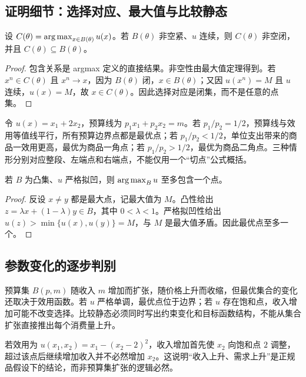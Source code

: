 \subsection{证明细节：选择对应、最大值与比较静态}

\begin{proposition}[选择对应的集合值性质]
设 $C(\theta)=\operatorname*{arg\,max}_{x\in B(\theta)}u(x)$。若 $B(\theta)$ 非空紧、$u$ 连续，则 $C(\theta)$ 非空闭，并且 $C(\theta)\subseteq B(\theta)$。
\end{proposition}
\begin{proof}
包含关系是 argmax 定义的直接结果。非空性由最大值定理得到。若 $x^n\in C(\theta)$ 且 $x^n\to x$，因为 $B(\theta)$ 闭，$x\in B(\theta)$；又因 $u(x^n)=M$ 且 $u$ 连续，$u(x)=M$，故 $x\in C(\theta)$。因此选择对应是闭集，而不是任意的点集。
\end{proof}

\begin{example}[线性效用的整段最优]
令 $u(x)=x_1+2x_2$，预算线为 $p_1x_1+p_2x_2=m$。若 $p_1/p_2=1/2$，预算线与效用等值线平行，所有预算边界点都是最优点；若 $p_1/p_2<1/2$，单位支出带来的商品一效用更高，最优为商品一角点；若 $p_1/p_2>1/2$，最优为商品二角点。三种情形分别对应整段、左端点和右端点，不能仅用一个“切点”公式概括。
\end{example}

\begin{proposition}[严格拟凹性与唯一性]
若 $B$ 为凸集、$u$ 严格拟凹，则 $\operatorname*{arg\,max}_Bu$ 至多包含一个点。
\end{proposition}
\begin{proof}
反设 $x\ne y$ 都是最大点，记最大值为 $M$。凸性给出 $z=\lambda x+(1-\lambda)y\in B$，其中 $0<\lambda<1$。严格拟凹性给出
$u(z)>\min\{u(x),u(y)\}=M$，与 $M$ 是最大值矛盾。因此最优点至多一个。
\end{proof}

\subsection{参数变化的逐步判别}
预算集 $B(p,m)$ 随收入 $m$ 增加而扩张，随价格上升而收缩，但最优集合的变化还取决于效用函数。若 $u$ 严格单调，最优点位于边界；若 $u$ 存在饱和点，收入增加可能不改变选择。比较静态必须同时写出约束变化和目标函数结构，不能从集合扩张直接推出每个消费量上升。

\begin{example}[收入扩张与非正规品]
若效用为 $u(x_1,x_2)=x_1-(x_2-2)^2$，收入增加首先使 $x_2$ 向饱和点 $2$ 调整，超过该点后继续增加收入并不必然增加 $x_2$。这说明“收入上升、需求上升”是正规品假设下的结论，而非预算集扩张的逻辑必然。
\end{example}

